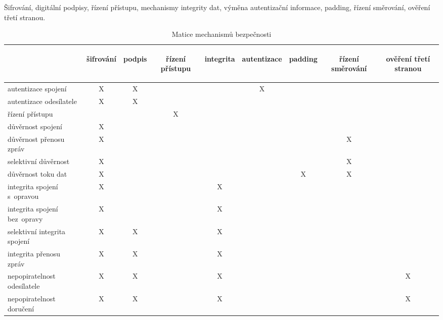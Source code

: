 Šifrování, digitální podpisy, řízení přístupu, mechanismy integrity dat, výměna autentizační informace, padding, řízení směrování, ověření třetí stranou.

\begin{table}[ht]
	\centering
	\onehalfspacing

	\begin{tabular}{|l|cccccccc|}
		&
		\begin{sideways}šifrování\end{sideways} &
		\begin{sideways}podpis\end{sideways} &
		\begin{sideways}řízení přístupu\end{sideways} &
		\begin{sideways}integrita\end{sideways} &
		\begin{sideways}autentizace\end{sideways} &
		\begin{sideways}padding\end{sideways} &
		\begin{sideways}řízení směrování\end{sideways} &
		\begin{sideways}ověření třetí stranou\end{sideways} \\
		\hline\hline
		autentizace spojení          & X & X &   &   & X &   &   &   \\
		autentizace odesílatele      & X & X &   &   &   &   &   &   \\
		řízení přístupu              &   &   & X &   &   &   &   &   \\
		důvěrnost spojení            & X &   &   &   &   &   &   &   \\
		důvěrnost přenosu zpráv      & X &   &   &   &   &   & X &   \\
		selektivní důvěrnost         & X &   &   &   &   &   & X &   \\
		důvěrnost toku dat           & X &   &   &   &   & X & X &   \\
		integrita spojení s~opravou  & X &   &   & X &   &   &   &   \\
		integrita spojení bez~opravy & X &   &   & X &   &   &   &   \\
		selektivní integrita spojení & X & X &   & X &   &   &   &   \\
		integrita přenosu zpráv      & X & X &   & X &   &   &   &   \\
		nepopiratelnost odesílatele  & X & X &   & X &   &   &   & X \\
		nepopiratelnost doručení     & X & X &   & X &   &   &   & X \\
	\end{tabular}

	\caption{Matice mechanismů bezpečnosti}
\end{table}


